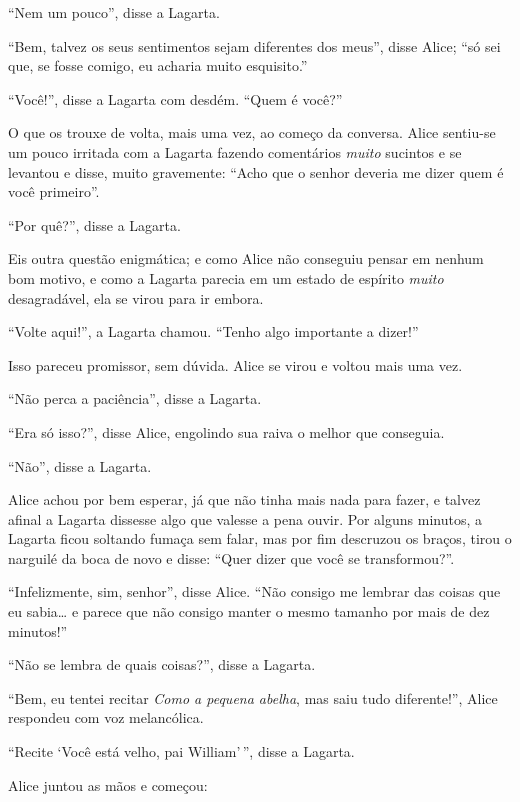 ``Nem um pouco'', disse a Lagarta.

``Bem, talvez os seus sentimentos sejam diferentes dos meus'', disse
Alice; ``só sei que, se fosse comigo, eu acharia muito esquisito.''

``Você!'', disse a Lagarta com desdém. ``Quem é você?''

O que os trouxe de volta, mais uma vez, ao começo da conversa. Alice
sentiu-se um pouco irritada com a Lagarta fazendo comentários
\emph{muito} sucintos e se levantou e disse, muito gravemente: ``Acho
que o senhor deveria me dizer quem é você primeiro''.

``Por quê?'', disse a Lagarta.

Eis outra questão enigmática; e como Alice não conseguiu pensar em
nenhum bom motivo, e como a Lagarta parecia em um estado de espírito
\emph{muito} desagradável, ela se virou para ir embora.

``Volte aqui!'', a Lagarta chamou. ``Tenho algo importante a dizer!''

Isso pareceu promissor, sem dúvida. Alice se virou e voltou mais uma vez.

``Não perca a paciência'', disse a Lagarta.

``Era só isso?'', disse Alice, engolindo sua raiva o melhor que conseguia.

``Não'', disse a Lagarta.

Alice achou por bem esperar, já que não tinha mais nada para fazer, e
talvez afinal a Lagarta dissesse algo que valesse a pena ouvir. Por alguns
minutos, a Lagarta ficou soltando fumaça sem falar, mas por fim
descruzou os braços, tirou o narguilé da boca de novo e disse: ``Quer
dizer que você se transformou?''.

``Infelizmente, sim, senhor'', disse Alice. ``Não consigo me lembrar das
coisas que eu sabia\ldots{} e parece que não consigo manter o mesmo tamanho
por mais de dez minutos!''

``Não se lembra de quais coisas?'', disse a Lagarta.

``Bem, eu tentei recitar \emph{Como a pequena abelha}, mas saiu tudo
diferente!'', Alice respondeu com voz melancólica.

``Recite `Você está velho, pai William'\,'', disse a Lagarta.

Alice juntou as mãos e começou:

